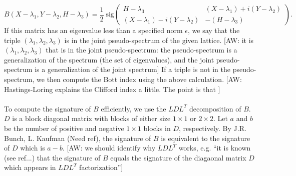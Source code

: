 \documentclass[a4paper]{article}
\newcommand{\aw}[1]{{\color{blue} [AW: #1]}}
\begin{document}
$$B(X-\lambda_1,Y - \lambda_2, H - \lambda_3) = \frac{1}{2}\; \text{sig}\begin{pmatrix}
H - \lambda_3 & (X - \lambda_1) + i(Y - \lambda_2)\\
(X - \lambda_1) - i(Y - \lambda_2) & - (H - \lambda_3)
\end{pmatrix}.$$
If this matrix has an eigenvalue less than a specified norm $\epsilon$, we say that the triple $(\lambda_1,\lambda_2,\lambda_3)$ is in the joint pseudo-spectrum of the given lattice.\aw{it is $(\lambda_1,\lambda_2,\lambda_3)$ that is in the joint pseudo-spectrum: the pseudo-spectrum is a generalization of the spectrum (the set of eigenvalues), and the joint pseudo-spectrum is a generalization of the joint spectrum}
If a triple is not in the pseudo-spectrum, we then compute the Bott index using the above calculation. \aw{Hastings-Loring explains the Clifford index a little. The point is that } \\\\
To compute the signature of $B$ efficiently, we use the $LDL^T$ decomposition of $B$.
$D$ is a block diagonal matrix with blocks of either size $1 \times 1$ or $2 \times 2$.
Let $a$ and $b$ be the number of positive and negative $1 \times 1$ blocks in $D$, respectively.
By J.R. Bunch, L. Kaufman (Need ref), the signature of $B$ is equivalent to the signature of $D$ which is $a - b$. \aw{we should identify why $L D L^T$ works, e.g. ``it is known (see ref...) that the signature of $B$ equals the signature of the diagaonal matrix $D$ which appears in $L D L^T$ factorization''}
\end{document}

